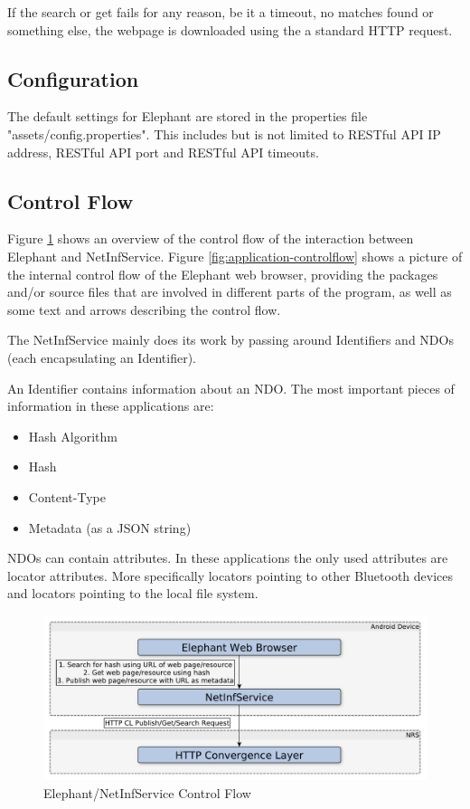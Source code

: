 If the search or get fails for any reason, be it a timeout, no matches found or something else, the webpage is downloaded using the a standard HTTP request.

\subsection{Configuration}
\label{sec:ConfigurationElephant}

The default settings for Elephant are stored in the properties file "assets/config.properties". This includes but is not limited to RESTful API IP address, RESTful API port and RESTful API timeouts.

\subsection{Control Flow}
\label{sec:Control Flow}

Figure \ref{fig:macro-controlflow} shows an overview of the control flow of the interaction between Elephant and NetInfService.
Figure \ref{fig:application-controlflow} shows a picture of the internal control flow of the Elephant web browser, providing the packages and/or source files that are
involved in different parts of the program, as well as some text and arrows describing the control flow.

The NetInfService mainly does its work by passing around Identifiers and NDOs (each encapsulating an Identifier).

An Identifier contains information about an NDO. The most important pieces of information in these applications are:
\begin{itemize}
\item Hash Algorithm
\item Hash
\item Content-Type
\item Metadata (as a JSON string)
\end{itemize}

NDOs can contain attributes. In these applications the only used attributes are locator attributes. More specifically locators pointing to other Bluetooth devices and locators pointing to the local file system.

\begin{figure}
\centering
\centerline{\includegraphics[width=1.4\textwidth]{./img/flowchart-macros.pdf}}
\caption{Elephant/NetInfService Control Flow}
\label{fig:macro-controlflow}
\end{figure}

